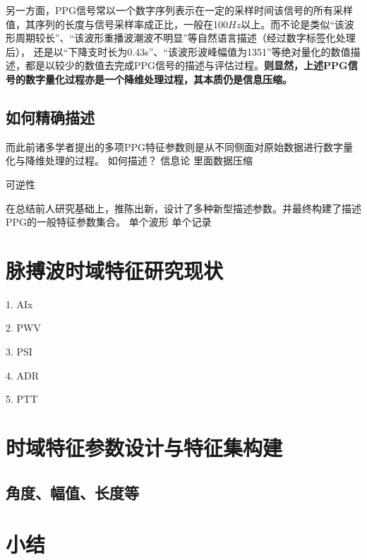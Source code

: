 另一方面，PPG信号常以一个数字序列表示在一定的采样时间该信号的所有采样值，其序列的长度与信号采样率成正比，一般在100$Hz$以上。而不论是类似“该波形周期较长”、“该波形重播波潮波不明显”等自然语言描述（经过数字标签化处理后），
还是以“下降支时长为0.43s”、“该波形波峰幅值为1351”等绝对量化的数值描述，都是以较少的数值去完成PPG信号的描述与评估过程。\textbf{则显然，上述PPG信号的数字量化过程亦是一个降维处理过程，其本质仍是信息压缩。}

\subsection{如何精确描述}
而此前诸多学者提出的多项PPG特征参数则是从不同侧面对原始数据进行数字量化与降维处理的过程。
如何描述？
信息论 里面数据压缩

可逆性


在总结前人研究基础上，推陈出新，设计了多种新型描述参数。并最终构建了描述PPG的一般特征参数集合。
单个波形
单个记录

\section{脉搏波时域特征研究现状}
1. AIx

2. PWV

3. PSI

4. ADR

5. PTT

\section{时域特征参数设计与特征集构建}
\subsection{角度、幅值、长度等}
\section{小结}